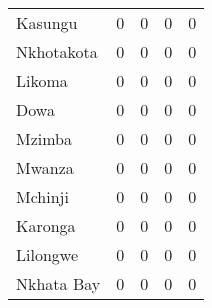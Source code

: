 \begin{tabular}{lrrrr}
Kasungu    &              0 &              0 &              0 &              0 \\
Nkhotakota &              0 &              0 &              0 &              0 \\
Likoma     &              0 &              0 &              0 &              0 \\
Dowa       &              0 &              0 &              0 &              0 \\
Mzimba     &              0 &              0 &              0 &              0 \\
Mwanza     &              0 &              0 &              0 &              0 \\
Mchinji    &              0 &              0 &              0 &              0 \\
Karonga    &              0 &              0 &              0 &              0 \\
Lilongwe   &              0 &              0 &              0 &              0 \\
Nkhata Bay &              0 &              0 &              0 &              0 \\
\bottomrule
\end{tabular}
